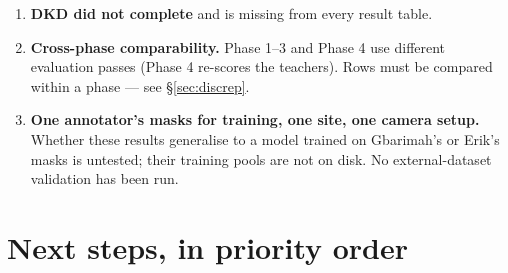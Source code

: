 \documentclass[11pt]{article}
\begin{document}
\begin{enumerate}[leftmargin=1.7em,itemsep=4pt]
  \item \textbf{DKD did not complete} and is missing from every result table.

  \item \textbf{Cross-phase comparability.} Phase 1--3 and Phase 4 use different evaluation passes
  (Phase 4 re-scores the teachers). Rows must be compared within a phase --- see
  \S\ref{sec:discrep}.

  \item \textbf{One annotator's masks for training, one site, one camera setup.} Whether these
  results generalise to a model trained on Gbarimah's or Erik's masks is untested; their training
  pools are not on disk. No external-dataset validation has been run.
\end{enumerate}

\section{Next steps, in priority order}
\end{document}
